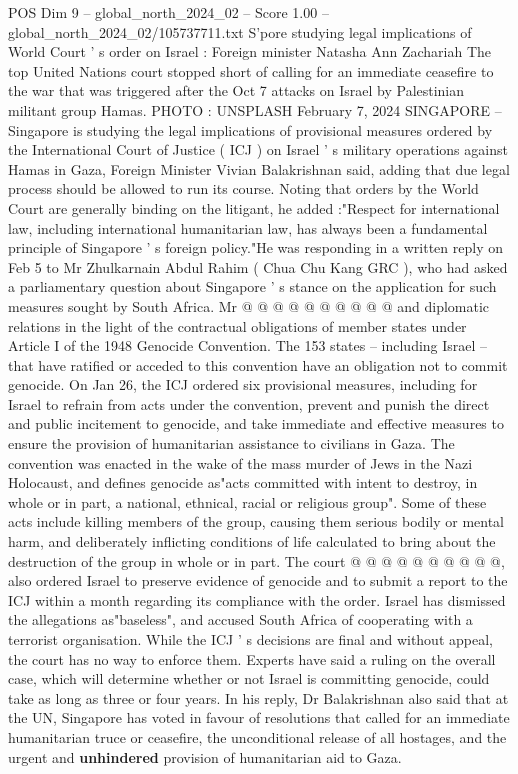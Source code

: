 \begin{textsample}{POS Dim 9 – global\_north\_2024\_02 – Score 1.00 – global\_north\_2024\_02/105737711.txt}  \label{ex:f9_pos_211}
S'pore studying legal implications of World Court ' s order on Israel : Foreign minister Natasha Ann Zachariah The top United Nations court stopped short of calling for an immediate ceasefire to the war that was triggered after the Oct 7 attacks on Israel by Palestinian militant group Hamas.
PHOTO : UNSPLASH February 7, 2024 SINGAPORE -- Singapore is studying the legal implications of provisional measures ordered by the International Court of Justice ( ICJ ) on Israel ' s military operations against Hamas in Gaza, Foreign Minister Vivian Balakrishnan said, adding that due legal process should be allowed to run its course.
Noting that orders by the World Court are generally binding on the litigant, he added :"Respect for international law, including international humanitarian law, has always been a fundamental principle of Singapore ' s foreign policy."He was responding in a written reply on Feb 5 to Mr Zhulkarnain Abdul Rahim ( Chua Chu Kang GRC ), who had asked a parliamentary question about Singapore ' s stance on the application for such measures sought by South Africa.
Mr @ @ @ @ @ @ @ @ @ @ and diplomatic relations in the light of the contractual obligations of member states under Article I of the 1948 Genocide Convention.
The 153 states -- including Israel -- that have ratified or acceded to this convention have an obligation not to commit genocide.
On Jan 26, the ICJ ordered six provisional measures, including for Israel to refrain from acts under the convention, prevent and punish the direct and public incitement to genocide, and take immediate and effective measures to ensure the provision of humanitarian assistance to civilians in Gaza.
The convention was enacted in the wake of the mass murder of Jews in the Nazi Holocaust, and defines genocide as"acts committed with intent to destroy, in whole or in part, a national, ethnical, racial or religious group".
Some of these acts include killing members of the group, causing them serious bodily or mental harm, and deliberately inflicting conditions of life calculated to bring about the destruction of the group in whole or in part.
The court @ @ @ @ @ @ @ @ @ @, also ordered Israel to preserve evidence of genocide and to submit a report to the ICJ within a month regarding its compliance with the order.
Israel has dismissed the allegations as"baseless", and accused South Africa of cooperating with a terrorist organisation.
While the ICJ ' s decisions are final and without appeal, the court has no way to enforce them.
Experts have said a ruling on the overall case, which will determine whether or not Israel is committing genocide, could take as long as three or four years.
In his reply, Dr Balakrishnan also said that at the UN, Singapore has voted in favour of resolutions that called for an immediate humanitarian truce or ceasefire, the unconditional release of all hostages, and the urgent and \textbf{unhindered} provision of humanitarian aid to Gaza.

\end{textsample}
